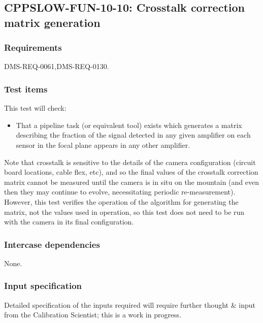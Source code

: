 \subsection{CPPSLOW-FUN-10-10: Crosstalk correction matrix generation}
\label{cppslow-fun-10-10}

\subsubsection{Requirements}

DMS-REQ-0061,DMS-REQ-0130.

\subsubsection{Test items}

This test will check:

\begin{itemize}

  \item{That a pipeline task (or equivalent tool) exists which generates a
  matrix describing the fraction of the signal detected in any given amplifier
  on each sensor in the focal plane appears in any other amplifier.}

\end{itemize}

Note that crosstalk is sensitive to the details of the camera configuration
(circuit board locations, cable flex, etc), and so the final values of the
crosstalk correction matrix cannot be measured until the camera is in situ on
the mountain (and even then they may continue to evolve, necessitating periodic
re-measurement). However, this test verifies the operation of the algorithm for
generating the matrix, not the values used in operation, so this test does not
need to be run with the camera in its final configuration.

\subsubsection{Intercase dependencies}

None.

\subsubsection{Input specification}

\begin{note}
Detailed specification of the inputs required will require further thought \&
input from the Calibration Scientist; this is a work in progress.
\end{note}

